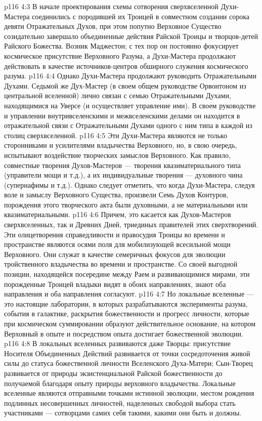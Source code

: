 \vs p116 4:3 В начале проектирования схемы сотворения сверхвселенной Духи\hyp{}Мастера соединились с породившей их Троицей в совместном создании сорока девяти Отражательных Духов, при этом попутно Верховное Существо созидательно завершало объединенные действия Райской Троицы и творцов\hyp{}детей Райского Божества. Возник Маджестон; с тех пор он постоянно фокусирует космическое присутствие Верховного Разума, а Духи\hyp{}Мастера продолжают действовать в качестве источников\hyp{}центров обширного служения космического разума.
\vs p116 4:4 Однако Духи\hyp{}Мастера продолжают руководить Отражательными Духами. Седьмой же Дух\hyp{}Мастер (в своем общем руководстве Орвонтоном из центральной вселенной) лично связан с семью Отражательными Духами, находящимися на Уверсе (и осуществляет управление ими). В своем руководстве и управлении внутривселенскими и межвселенскими делами он находится в отражательной связи с Отражательными Духами одного с ним типа в каждой из столиц сверхвселенной.
\vs p116 4:5 Эти Духи\hyp{}Мастера являются не только сторонниками и усилителями владычества Верховного, но, в свою очередь, испытывают воздействие творческих замыслов Верховного. Как правило, совместные творения Духов\hyp{}Мастеров --- творения квазиматериального типа (управители мощи и т.д.), а их индивидуальные творения --- духовного чина (супернафимы и т.д.). Однако следует отметить, что когда Духи\hyp{}Мастера, следуя воле и замыслу Верховного Существа,  произвели Семь Духов Контуров, порождения этого творческого акта были духовными, а не материальными или квазиматериальными.
\vs p116 4:6 \pc Причем, это касается как Духов\hyp{}Мастеров сверхвселенных, так и Древних Дней, триединых правителей этих сверхтворений. Эти олицетворения справедливости и правосудия Троицы во времени и пространстве являются осями поля для мобилизующей всесильной мощи Верховного. Они служат в качестве семеричных фокусов для эволюции тройственного владычества во времени и пространстве. Со своей выгодной позиции, находящейся посередине между Раем и развивающимися мирами, эти порожденные Троицей владыки видят в обоих направлениях, знают оба направления и оба направления согласуют.
\vs p116 4:7 \pc Но локальные вселенные --- это настоящие лаборатории, в которых разрабатываются эксперименты разума, события в галактике, раскрытия божественности и прогресс личности, которые при космическом суммировании образуют действительное основание, на котором Верховный в опыте и посредством опыта достигает божественной эволюции.
\vs p116 4:8 В локальных вселенных развиваются даже Творцы: присутствие Носителя Объединенных Действий развивается от точки сосредоточения живой силы до статуса божественной личности Вселенского Духа\hyp{}Матери; Сын\hyp{}Творец развивается от природы экзистенциальной Райской божественности до получаемой благодаря опыту природы верховного владычества. Локальные вселенные являются отправными точками истинной эволюции, местом рождения подлинных несовершенных личностей, наделенных свободой выбора стать участниками --- сотворцами самих себя такими, какими они быть и должны.
